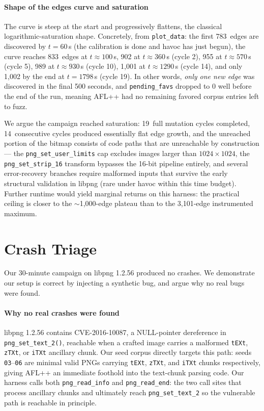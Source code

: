 \paragraph{Shape of the edges curve and saturation}
The curve is steep at the start and progressively flattens, the
classical logarithmic-saturation shape. Concretely, from \texttt{plot\_data}:
the first 783~edges are discovered by $t=60$\,s (the calibration is
done and havoc has just begun), the curve reaches 833~edges at
$t\approx100$\,s, 902 at $t\approx360$\,s (cycle 2), 955 at
$t\approx570$\,s (cycle 5), 989 at $t\approx930$\,s (cycle 10),
1{,}001 at $t\approx1290$\,s (cycle 14), and only 1{,}002 by the end
at $t=1798$\,s (cycle 19). In other words, \emph{only one new edge}
was discovered in the final 500 seconds, and \texttt{pending\_favs}
dropped to 0 well before the end of the run, meaning AFL++ had no
remaining favored corpus entries left to fuzz.

We argue the campaign reached saturation: 19~full mutation cycles
completed, 14~consecutive cycles produced essentially flat edge growth,
and the unreached portion of the bitmap consists of code paths that
are unreachable by construction --- the \texttt{png\_set\_user\_limits}
cap excludes images larger than $1024{\times}1024$, the
\texttt{png\_set\_strip\_16} transform bypasses the 16-bit pipeline
entirely, and several error-recovery branches require malformed inputs
that survive the early structural validation in libpng (rare under
havoc within this time budget). Further runtime would yield marginal
returns on this harness: the practical ceiling is closer to the
$\sim$1{,}000-edge plateau than to the 3{,}101-edge instrumented
maximum.

\vspace{-8pt}
\section{Crash Triage}
\vspace{-7pt}
Our 30-minute campaign on libpng 1.2.56 produced no crashes.
We demonstrate our setup is correct by injecting a synthetic bug,
and argue why no real bugs were found.
\vspace{-12pt}
\paragraph{Why no real crashes were found}
libpng 1.2.56 contains CVE-2016-10087, a NULL-pointer dereference
in \verb|png_set_text_2()|, reachable when a crafted image carries
a malformed \verb|tEXt|, \verb|zTXt|, or \verb|iTXt| ancillary chunk.
Our seed corpus directly targets this path: seeds \verb|03|--\verb|06|
are minimal valid PNGs carrying \verb|tEXt|, \verb|zTXt|, and \verb|iTXt|
chunks respectively, giving AFL++ an immediate foothold into the
text-chunk parsing code. Our harness calls both \verb|png_read_info|
and \verb|png_read_end|: the two call sites that process ancillary
chunks and ultimately reach \verb|png_set_text_2| so the vulnerable
path is reachable in principle.

